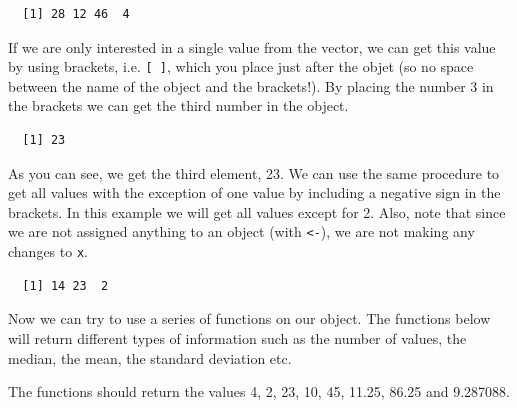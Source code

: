 \documentclass[12pt,oneside]{reedthesis}
\theoremstyle{definition}
\theoremstyle{definition}
\theoremstyle{definition}
\theoremstyle{remark}
\begin{document}
  \begin{verbatim}
  [1] 28 12 46  4
  \end{verbatim}
  If we are only interested in a single value from the vector, we can get
  this value by using brackets, i.e. \texttt{{[}\ {]}}, which you place
  just after the objet (so no space between the name of the object and the
  brackets!). By placing the number 3 in the brackets we can get the third
  number in the object.
  \begin{Shaded}
  \begin{Highlighting}[]
  \NormalTok{x[}\NormalTok{]}
  \end{Highlighting}
  \end{Shaded}
  \begin{verbatim}
  [1] 23
  \end{verbatim}
  As you can see, we get the third element, 23. We can use the same
  procedure to get all values with the exception of one value by including
  a negative sign in the brackets. In this example we will get all values
  except for 2. Also, note that since we are not assigned anything to an
  object (with \texttt{\textless{}-}), we are not making any changes to
  \texttt{x}.
  \begin{Shaded}
  \begin{Highlighting}[]
  \NormalTok{x[}\OperatorTok{-}\NormalTok{]}
  \end{Highlighting}
  \end{Shaded}
  \begin{verbatim}
  [1] 14 23  2
  \end{verbatim}
  Now we can try to use a series of functions on our object. The functions
  below will return different types of information such as the number of
  values, the median, the mean, the standard deviation etc.
  \begin{Shaded}
  \begin{Highlighting}[]
  \end{Highlighting}
  \end{Shaded}
  The functions should return the values 4, 2, 23, 10, 45, 11.25, 86.25
  and 9.287088.
  
\end{document}

